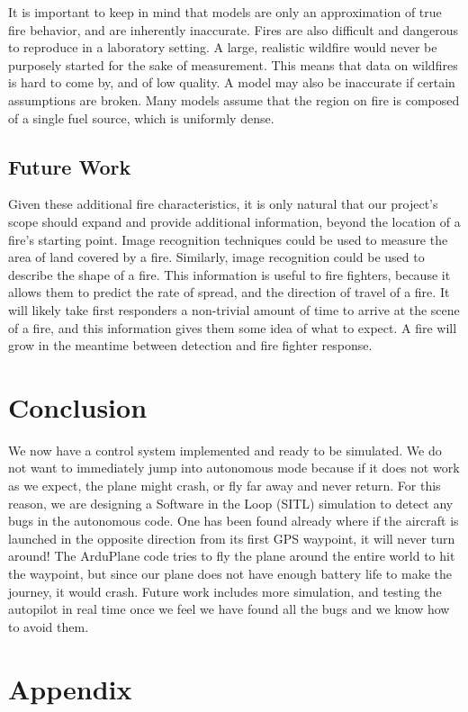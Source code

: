 \documentclass[12pt,journal,compsoc]{IEEEtran}
\begin{document}
It is important to keep in mind that models are only an approximation of true fire behavior, and are inherently inaccurate. Fires are also difficult and dangerous to reproduce in a laboratory setting. A large, realistic wildfire would never be purposely started for the sake of measurement. This means that data on wildfires is hard to come by, and of low quality. A model may also be inaccurate if certain assumptions are broken. Many models assume that the region on fire is composed of a single fuel source, which is uniformly dense.

\subsection{Future Work}
Given these additional fire characteristics, it is only natural that our project's scope should expand and provide additional information, beyond the location of a fire's starting point. Image recognition techniques could be used to measure the area of land covered by a fire. Similarly, image recognition could be used to describe the shape of a fire. This information is useful to fire fighters, because it allows them to predict the rate of spread, and the direction of travel of a fire. It will likely take first responders a non-trivial amount of time to arrive at the scene of a fire, and this information gives them some idea of what to expect. A fire will grow in the meantime between detection and fire fighter response. 

\section{Conclusion}
We now have a control system implemented and ready to be simulated. We do not want to immediately jump into autonomous mode because if it does not work as we expect, the plane might crash, or fly far away and never return. For this reason, we are designing a Software in the Loop (SITL) simulation to detect any bugs in the autonomous code. One has been found already where if the aircraft is launched in the opposite direction from its first GPS waypoint, it will never turn around! The ArduPlane code tries to fly the plane around the entire world to hit the waypoint, but since our plane does not have enough battery life to make the journey, it would crash. Future work includes more simulation, and testing the autopilot in real time once we feel we have found all the bugs and we know how to avoid them.

\appendices
\section*{Appendix}
\end{document}
